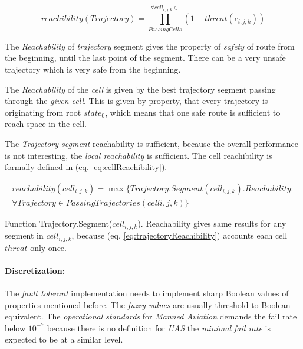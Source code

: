 \begin{equation}\label{eq:trajectoryReachibility}
    reachibility(Trajectory) = \prod_{Passing Cells}^{\forall cell_{i,j,k}\in} \left(1- threat(c_{i,j,k})\right)
\end{equation}

\begin{note}
    The \emph{Reachability} of \emph{trajectory} segment gives the property of \emph{safety} of route from the beginning, until the last point of the segment. There can be a very unsafe trajectory which is very safe from the beginning.
\end{note}


The \emph{Reachability} of the \emph{cell} is given by the best trajectory segment passing through the \emph{given cell}. This is given by property, that every trajectory is originating from root $state_0$, which means that one safe route is sufficient to reach space in the cell.

The \emph{Trajectory segment} reachability is sufficient, because the overall performance is not interesting, the \emph{local reachability} is sufficient. The cell reachibility is formally defined in (eq. \ref{eq:cellReachibility}).

\begin{multline}\label{eq:cellReachibility}
    reachability(cell_{i,j,k}) = \max\{Trajectory.Segment(cell_{i,j,k}). Reachability: \\\forall Trajectory \in Passing Trajectories (cell{i,j,k})\}
\end{multline}
    
\begin{note}
    Function Trajectory.Segment($cell_{i,j,k}$). Reachability gives same results for any segment in $cell_{i,j,k}$, because (eq. \ref{eq:trajectoryReachibility}) accounts each cell $threat$ only once.
\end{note}

\paragraph{Discretization:} The \emph{fault tolerant} implementation needs to implement sharp Boolean values of properties mentioned before. The \emph{fuzzy values} are usually threshold to Boolean equivalent. The \emph{operational standards} for \emph{Manned Aviation} \cite{icao4444} demands the fail rate below $10^{-7}$ because there is no definition for \emph{UAS} the \emph{minimal fail rate} is expected to be at a similar level.

